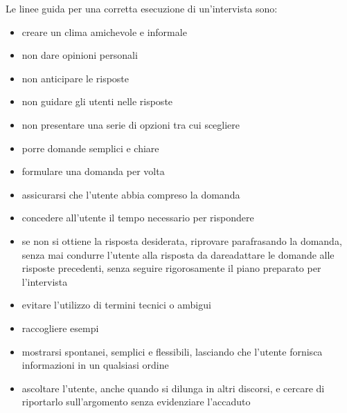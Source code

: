 \documentclass{report}
\begin{document}
	Le linee guida per una corretta esecuzione di un'intervista sono:
	\begin{itemize}
		\item creare un clima amichevole e informale
		\item non dare opinioni personali
		\item non anticipare le risposte
		\item non guidare gli utenti nelle risposte
		\item non presentare una serie di opzioni tra cui scegliere
		\item porre domande semplici e chiare
		\item formulare una domanda per volta
		\item assicurarsi che l'utente abbia compreso la domanda
		\item concedere all'utente il tempo necessario per rispondere
		\item se non si ottiene la risposta desiderata, riprovare parafrasando la domanda, senza mai condurre l'utente alla risposta da dareadattare le domande alle risposte precedenti, senza seguire rigorosamente il piano preparato per l'intervista
		\item evitare l'utilizzo di termini tecnici o ambigui
		\item raccogliere esempi
		\item mostrarsi spontanei, semplici e flessibili, lasciando che l'utente fornisca informazioni in un qualsiasi ordine
		\item ascoltare l'utente, anche quando si dilunga in altri discorsi, e cercare di riportarlo sull'argomento senza evidenziare l'accaduto
	\end{itemize}
\end{document}
